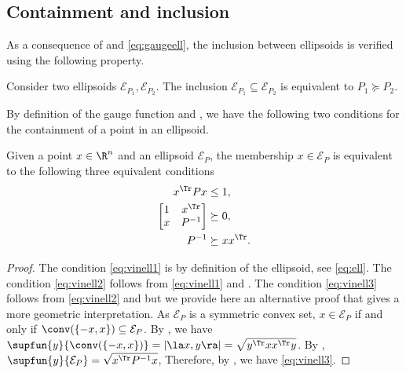 \documentclass[11pt,twoside,a4paper,openright]{uclouvain-thesis}
\begin{document}
\subsection{Containment and inclusion}

As a consequence of  and \eqref{eq:gaugeell},
the inclusion between ellipsoids is verified using the following property.
\begin{myprop}
  \label{prop:ellincl}
  Consider two ellipsoids $\mathcal{E}_{P_1}, \mathcal{E}_{P_2}$.
  The inclusion $\mathcal{E}_{P_1} \subseteq \mathcal{E}_{P_2}$ is equivalent to
  $P_1 \succeq P_2$.
\end{myprop}

By definition of the gauge function and , we have
the following two conditions for the containment of a point in an ellipsoid.
\begin{myprop}
  \label{prop:vinell}
  Given a point $x \in \R^n$ and an ellipsoid $\mathcal{E}_P$,
  the membership $x \in \mathcal{E}_P$ is equivalent to the following three equivalent conditions
  \begin{align}
    \label{eq:vinell1}
    x^\Tr P x & \le 1,\\
    \label{eq:vinell2}
    \begin{bmatrix}
      1 & x^\Tr\\
      x & P^{-1}
    \end{bmatrix}
    & \succeq 0,\\
    \label{eq:vinell3}
    P^{-1} & \succeq xx^\Tr.
  \end{align}
  \begin{proof}
    The condition \eqref{eq:vinell1} is by definition of the ellipsoid, see \eqref{eq:ell}.
    The condition \eqref{eq:vinell2} follows from \eqref{eq:vinell1} and .
    The condition \eqref{eq:vinell3} follows from \eqref{eq:vinell2} and  but we provide here an alternative proof
    that gives a more geometric interpretation.
    As $\mathcal{E}_P$ is a symmetric convex set, $x \in \mathcal{E}_P$
    if and only if $\conv(\{-x, x\}) \subseteq \mathcal{E}_P$.
    By , we have $\supfun{y}{\conv(\{-x, x\})} = |\la x, y \ra| = \sqrt{y^\Tr x x^\Tr y}$.
    By , $\supfun{y}{\mathcal{E}_P} = \sqrt{x^\Tr P^{-1} x}$,
    Therefore, by , we have \eqref{eq:vinell3}.
  \end{proof}
\end{myprop}
\end{document}

